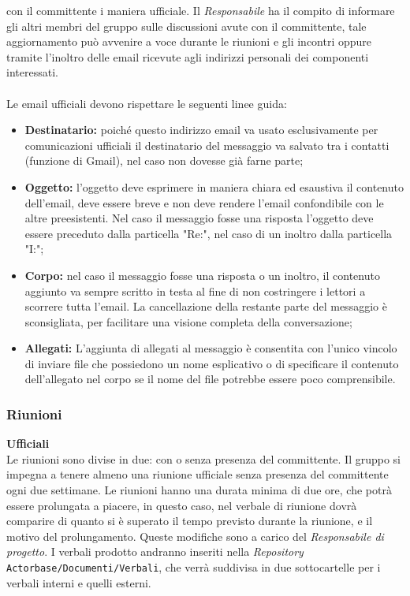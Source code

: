 \documentclass[a4paper]{article}
\begin{document}
	con il committente i maniera ufficiale. Il \emph{Responsabile} ha il compito di informare gli altri membri del gruppo sulle
	discussioni avute con il committente, tale aggiornamento può avvenire a voce durante le riunioni e gli incontri oppure tramite
	l'inoltro delle email ricevute agli indirizzi personali dei componenti interessati.
	\\ \\
	Le email ufficiali devono rispettare le seguenti linee guida:
	\begin{itemize}
		\item \textbf{Destinatario:} poiché questo indirizzo email va usato esclusivamente per comunicazioni ufficiali il destinatario
		del messaggio va salvato tra i contatti (funzione di Gmail), nel caso non dovesse già farne parte;
		\item \textbf{Oggetto:} l'oggetto deve esprimere in maniera chiara ed esaustiva il contenuto dell'email, deve essere breve
		 e non deve rendere l'email confondibile con le altre preesistenti.
		 Nel caso il messaggio fosse una risposta l'oggetto deve essere preceduto dalla particella "Re:", nel caso di un inoltro dalla
		 particella "I:";
		\item \textbf{Corpo:} nel caso il messaggio fosse una risposta o un inoltro, il contenuto aggiunto va sempre scritto in testa al
		fine di non costringere i lettori a scorrere tutta l'email. La cancellazione della restante parte del messaggio è sconsigliata, per
		facilitare una visione completa della conversazione;
		\item \textbf{Allegati:} L'aggiunta di allegati al messaggio è consentita con l'unico vincolo di inviare file che possiedono un nome
		esplicativo o di specificare il contenuto dell'allegato nel corpo se il nome del file potrebbe essere poco comprensibile.
	\end{itemize}
	\subsubsection{Riunioni}
		\textbf{Ufficiali} \\
		Le riunioni sono divise in due: con o senza presenza del committente. Il gruppo si impegna a tenere almeno una riunione
		ufficiale senza presenza del committente ogni due settimane. Le riunioni hanno una durata minima di due ore, che potrà
		essere prolungata a piacere, in questo caso, nel verbale di riunione dovrà comparire di quanto si è superato il tempo
		previsto durante la riunione, e il motivo del prolungamento. Queste modifiche sono a carico del \emph{Responsabile di progetto}.
		I verbali prodotto andranno inseriti nella \emph{Repository} \verb|Actorbase/Documenti/Verbali|, che verrà suddivisa in due
		sottocartelle per i verbali interni e quelli esterni.
\end{document}

